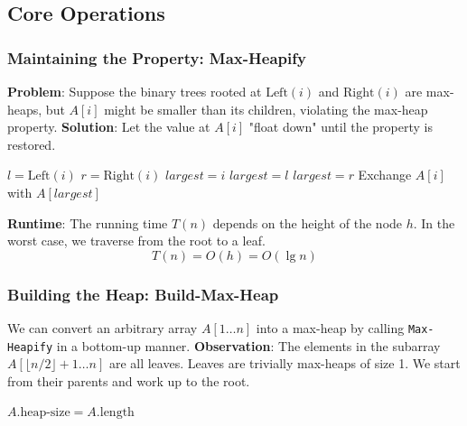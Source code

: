 \documentclass[12pt]{article}
\theoremstyle{blueplain}
\theoremstyle{bluedef}
\theoremstyle{blueremark}
\begin{document}
\subsection{Core Operations}

\subsubsection{Maintaining the Property: Max-Heapify}

\textbf{Problem}: Suppose the binary trees rooted at $\text{Left}(i)$ and $\text{Right}(i)$ are max-heaps, but $A[i]$ might be smaller than its children, violating the max-heap property.
\textbf{Solution}: Let the value at $A[i]$ "float down" until the property is restored.

\begin{algorithm}
    \caption{Max-Heapify}\label{alg:maxHeapify}
    \begin{algorithmic}[1]
        \State $l = \text{Left}(i)$
        \State $r = \text{Right}(i)$
        \State $largest = i$
        \State $largest = l$
        \EndIf
        \State $largest = r$
        \EndIf
        \State Exchange $A[i]$ with $A[largest]$
        \State {} 
        \EndIf
        \EndProcedure
    \end{algorithmic}
\end{algorithm}

\noindent \textbf{Runtime}: The running time $T(n)$ depends on the height of the node $h$. In the worst case, we traverse from the root to a leaf.
\[ T(n) = O(h) = O(\lg n) \]

\subsubsection{Building the Heap: Build-Max-Heap}

We can convert an arbitrary array $A[1 \dots n]$ into a max-heap by calling \texttt{Max-Heapify} in a bottom-up manner.
\textbf{Observation}: The elements in the subarray $A[\lfloor n/2 \rfloor + 1 \dots n]$ are all leaves. Leaves are trivially max-heaps of size 1. We start from their parents and work up to the root.

\begin{algorithm}
    \caption{Build-Max-Heap}\label{alg:buildMaxHeap}
    \begin{algorithmic}[1]
        \State $A.\text{heap-size} = A.\text{length}$
        \State {}
        \EndFor
        \EndProcedure
    \end{algorithmic}
\end{algorithm}
\end{document}
